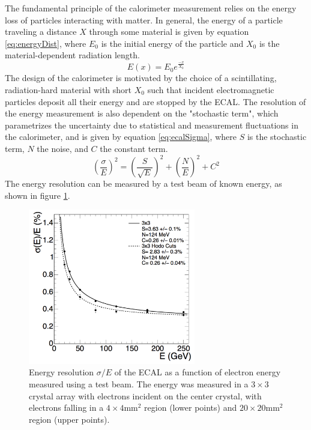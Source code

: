 The fundamental principle of the calorimeter measurement relies on the energy loss of particles interacting with matter. In general, the energy of a particle traveling a distance $X$ through some material is given by equation \ref{eq:energyDist}, where $E_0$ is the initial energy of the particle and $X_0$ is the material-dependent radiation length. 
\begin{equation}
	\label{eq:energyDist}
	E(x)=E_0 e^{\frac{-x}{X_0}}
\end{equation}
The design of the calorimeter is motivated by the choice of a scintillating, radiation-hard material with short $X_0$ such that incident electromagnetic particles deposit all their energy and are stopped by the ECAL. The resolution of the energy measurement is also dependent on the "stochastic term", which parametrizes the uncertainty due to statistical and measurement fluctuations in the calorimeter, and is given by equation \ref{eq:ecalSigma}, where $S$ is the stochastic term, $N$ the noise, and $C$ the constant term. 
\begin{equation}
	\label{eq:ecalSigma}
	\left(\frac{\sigma}{E}\right)^2=\left(\frac{S}{\sqrt{E}}\right)^2+\left(\frac{N}{E}\right)^2+C^2
\end{equation}
The energy resolution can be measured by a test beam of known energy, as shown in figure \ref{fig:ecalSigma}.
\begin{figure}
	\centering
	\includegraphics[width=0.65\textwidth]{detector/figs/ecalRes}
	\renewcommand{\baselinestretch}{1.0}
	\caption[Energy resolution $\sigma/E$ of the ECAL as a function of electron energy measured using a test beam.]{Energy resolution $\sigma/E$ of the ECAL as a function of electron energy measured using a test beam. The energy was measured in a $3\times3$ crystal array with electrons incident on the center crystal, with electrons falling in a $4\times4\text{mm}^2$ region (lower points) and $20\times20\text{mm}^2$ region (upper points).}
	\label{fig:ecalSigma}
\end{figure}

